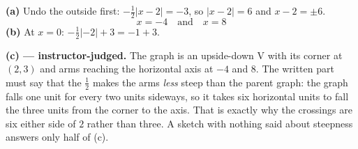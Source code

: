 \documentclass[12pt]{article}
\begin{document}
\textbf{(a)} Undo the outside first: $-\tfrac{1}{2}|x-2| = -3$, so $|x-2| = 6$ and $x - 2 = \pm 6$.
\[ \boxed{x = -4 \quad \text{and} \quad x = 8} \]
\textbf{(b)} At $x = 0$: $-\tfrac{1}{2}|{-2}| + 3 = -1 + 3$. 

\textbf{(c) --- instructor-judged.} The graph is an upside-down V with its corner at $(2,3)$ and arms reaching the horizontal axis at $-4$ and $8$. The written part must say that the $\tfrac{1}{2}$ makes the arms \emph{less} steep than the parent graph: the graph falls one unit for every two units sideways, so it takes six horizontal units to fall the three units from the corner to the axis. That is exactly why the crossings are six either side of $2$ rather than three. A sketch with nothing said about steepness answers only half of (c).
\end{document}
